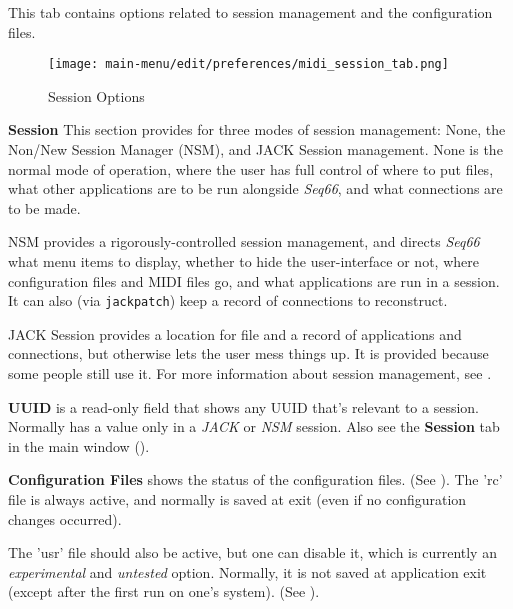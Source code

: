    This tab contains options related to session management and the
   configuration files.

\begin{figure}[H]
   \centering 
   \texttt{[image: main-menu/edit/preferences/midi\_session\_tab.png]}
   \caption{Session Options}
   \label{fig:midi_session_options_tab}
\end{figure}

   \setcounter{ItemCounter}{0}      %

   \textbf{Session}
   This section provides for three modes of session management:  None, the
   Non/New Session Manager (NSM), and JACK Session management.
   None is the normal mode of operation, where the user has full control of
   where to put files, what other applications are to be run alongside
   \textsl{Seq66}, and what connections are to be made.

   NSM provides a rigorously-controlled session management, and directs
   \textsl{Seq66} what menu items to display, whether to hide the
   user-interface or not, where configuration files and MIDI files go, and what
   applications are run in a session. It can also (via \texttt{jackpatch}) keep
   a record of connections to reconstruct.

   JACK Session provides a location for file and a record of applications and
   connections, but otherwise lets the user mess things up.  It is
   provided because some people still use it.
   For more information about session management, see
   .

   \textbf{UUID} is a read-only field that shows any UUID that's relevant to a
   session. Normally has a value only in a \textsl{JACK} or
   \textsl{NSM} session.
   Also see the \textbf{Session} tab in the main window
   ().

   \textbf{Configuration Files}
   shows the status of the configuration files.
   (See ).
   The 'rc' file is always active, and normally is saved at exit (even if no
   configuration changes occurred).

   The 'usr' file should also be active, but one can disable it, which is
   currently an \textsl{experimental} and \textsl{untested} option.
   Normally, it is not saved at application exit (except after the first run on
   one's system).
   (See ).

